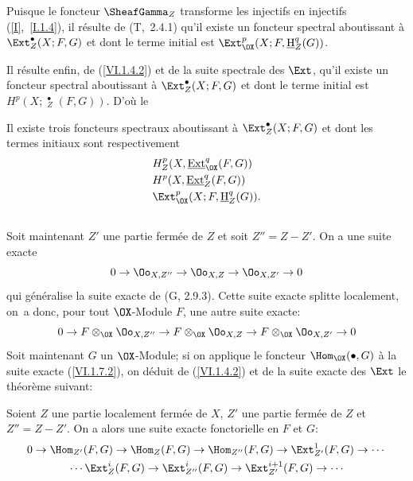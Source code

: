 Puisque le foncteur $\SheafGamma_Z$ transforme les injectifs en injectifs (\ref{I},~\ref{I.1.4}), il r\'esulte de (T,~2.4.1) qu'il existe un foncteur spectral aboutissant \`a $\Ext_{Z}^\bullet(X;F, G)$ et dont le terme initial est $\Ext_{\OX}^p(X;F, \mathop{\underline{\mathrm{H}}}\nolimits_Z^q(G))$.

Il r\'esulte enfin, de (\ref{VI.1.4.2}) et de la suite spectrale des $\Ext$, qu'il existe un foncteur spectral aboutissant \`a $\Ext^{\bullet}_Z(X;F, G)$ et dont le terme initial est $H^p(X;\mathop{\underline{\mathrm{Ext}}}\nolimits_Z^\bullet(F, G))$. D'o\`u le

\setcounter{equation}{0}

\begin{theoreme} \label{VI.1.6}
Il existe trois foncteurs spectraux aboutissant \`a $\Ext_{Z}^\bullet(X;F, G)$ et dont les termes initiaux sont respectivement
\begin{align}
\label{VI.1.6.1} &H_Z^p(X, \mathop{\underline{\mathrm{Ext}}}\nolimits_{\OX}^q(F, G))\\
\label{VI.1.6.2} &H^p(X, \mathop{\underline{\mathrm{Ext}}}\nolimits_Z^q(F, G))\\
\label{VI.1.6.3} &\Ext_{\OX}^p(X;F, \mathop{\underline{\mathrm{H}}}\nolimits_Z^q(G)).
\end{align}
\end{theoreme}

\subsection{} \label{VI.1.7}
Soit maintenant $Z'$ une partie ferm\'ee de $Z$ et soit $Z''=Z {-} Z'$. On a une suite exacte
\setcounter{equation}{0}
\begin{equation} \label{VI.1.7.1}
0 \to \Oo_{X, Z''} \to \Oo_{X, Z} \to \Oo_{X, Z'} \to 0
\end{equation}
qui g\'en\'eralise la suite exacte de (G, 2.9.3). Cette suite exacte splitte localement, on~a donc, pour tout $\OX$-Module $F$, une autre suite exacte:
\begin{equation} \label{VI.1.7.2} {0 \to F \otimes_{\OX} \Oo_{X, Z''} \to F \otimes_{\OX} \Oo_{X, Z} \to F \otimes_{\OX} \Oo_{X, Z'} \to 0}
\end{equation}
Soit maintenant $G$ un $\OX$-Module; si on applique le foncteur $\Hom_{\OX}(\bullet, G)$ \`a la suite exacte (\ref{VI.1.7.2}), on d\'eduit de (\ref{VI.1.4.2}) et de la suite exacte des $\Ext$ le th\'eor\`eme suivant:

\begin{theoreme} \label{VI.1.8}
Soient $Z$ une partie localement ferm\'ee de $X$, $Z'$ une partie ferm\'ee de $Z$ et $Z''=Z{-} Z'$. On a alors une suite exacte fonctorielle en $F$ et $G$:
\begin{gather*}
0 \to \Hom_{Z'}(F, G) \to \Hom_Z(F, G) \to \Hom_{Z''}(F, G)\to \Ext_{{Z'}}^1(F, G) \to \cdots{}\\
{}\cdots \Ext_{Z}^i(F, G) \to \Ext_{{Z''}}^i(F, G) \to \Ext_{{Z'}}^{i+1}(F, G) \to \cdots{}
\end{gather*}
\end{theoreme}

